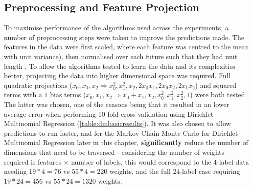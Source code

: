 \subsection{Preprocessing and Feature Projection}
To maximise performance of the algorithms used across the experiments, a number of preprocessing steps were taken to improve the predictions made. The features in the data were first scaled, where each feature was centred to the mean with unit variance), then normalised over each future such that they had unit length . To allow the algorithms tested to learn the data and its complexities better, projecting the data into higher dimensional space was required. Full quadratic projections ($x_0, x_1, x_2 \Rightarrow x_0^2 ,x_1^2 ,x_2 ,2x_0x_1 ,2x_0x_2 ,2x_1x_2$) and squared terms with a $1$ bias terms ($x_0, x_1, x_2 \Rightarrow x_0 + x_1 , x_2 ,x_0^2 ,x_1^2, x_2^2, 1$) were both tested. The latter was chosen, one of the reasons being that it resulted in an lower average error when performing 10-fold cross-validation using Dirichlet Multinomial Regression (\autoref{table:dmbasicresults}). It was also chosen to allow predictions to run faster, and for the Markov Chain Monte Carlo for Dirichlet Multinomial Regression later in this chapter, \textbf{significantly} reduce the number of dimensions that need to be traversed - considering the number of weights required is features $\times$ number of labels, this would correspond to the 4-label data needing $19*4=76$ vs $55*4=220$ weights, and the full 24-label case requiring $19*24=456$ vs $55*24=1320$ weights.



% 


